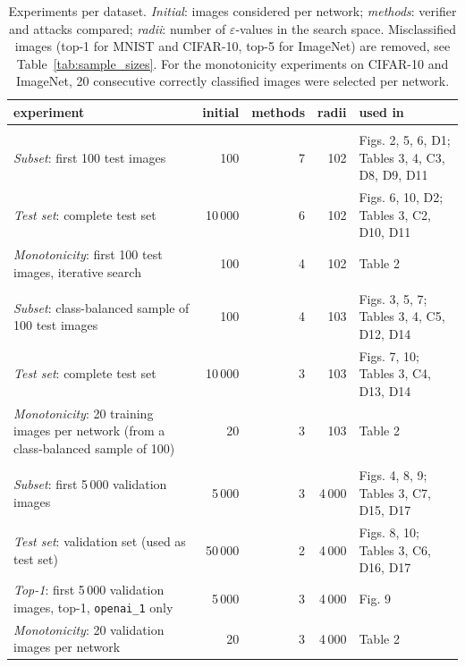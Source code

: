 \begin{table}[tbp]
  \centering
  \caption{Experiments per dataset. \emph{Initial}: images considered per network; \emph{methods}: verifier and attacks compared; \emph{radii}: number of $\varepsilon$-values in the search space. Misclassified images (top-1 for MNIST and CIFAR-10, top-5 for ImageNet) are removed, see Table~\ref{tab:sample_sizes}. For the monotonicity experiments on CIFAR-10 and ImageNet, 20 consecutive correctly classified images were selected per network.}
  \label{tab:experiments}
  \small
  \begin{tabularx}{\linewidth}{>{\raggedright\arraybackslash}Xrrr>{\raggedright\arraybackslash}p{3.6cm}}
  \toprule
  experiment & initial & methods & radii & used in \\
  \midrule
  \multicolumn{5}{l}{\textbf{MNIST}} \\
  \emph{Subset}: first 100 test images & 100 & 7 & 102 & Figs. 2, 5, 6, D1; Tables 3, 4, C3, D8, D9, D11 \\
  \emph{Test set}: complete test set & 10\,000 & 6 & 102 & Figs. 6, 10, D2; Tables 3, C2, D10, D11 \\
  \emph{Monotonicity}: first 100 test images, iterative search & 100 & 4 & 102 & Table 2 \\
  \midrule
  \multicolumn{5}{l}{\textbf{CIFAR-10}} \\
  \emph{Subset}: class-balanced sample of 100 test images & 100 & 4 & 103 & Figs. 3, 5, 7; Tables 3, 4, C5, D12, D14 \\
  \emph{Test set}: complete test set & 10\,000 & 3 & 103 & Figs. 7, 10; Tables 3, C4, D13, D14 \\
  \emph{Monotonicity}: 20 training images per network (from a class-balanced sample of 100) & 20 & 3 & 103 & Table 2 \\
  \midrule
  \multicolumn{5}{l}{\textbf{ImageNet}} \\
  \emph{Subset}: first 5\,000 validation images & 5\,000 & 3 & 4\,000 & Figs. 4, 8, 9; Tables 3, C7, D15, D17 \\
  \emph{Test set}: validation set (used as test set) & 50\,000 & 2 & 4\,000 & Figs. 8, 10; Tables 3, C6, D16, D17 \\
  \emph{Top-1}: first 5\,000 validation images, top-1, \texttt{openai\_1} only & 5\,000 & 3 & 4\,000 & Fig. 9 \\
  \emph{Monotonicity}: 20 validation images per network & 20 & 3 & 4\,000 & Table 2 \\
  \bottomrule
  \end{tabularx}
\end{table}
